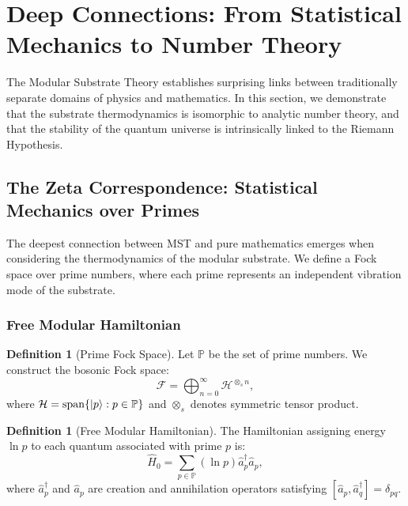 \documentclass[11pt, a4paper]{article}
\theoremstyle{plain}
\theoremstyle{definition}
\newtheorem{definition}[theorem]{Definition}
\begin{document}
\section{Deep Connections: From Statistical Mechanics to Number Theory}
\label{sec:connections}

The Modular Substrate Theory establishes surprising links between traditionally separate domains of physics and mathematics. In this section, we demonstrate that the substrate thermodynamics is isomorphic to analytic number theory, and that the stability of the quantum universe is intrinsically linked to the Riemann Hypothesis.

\subsection{The Zeta Correspondence: Statistical Mechanics over Primes}

The deepest connection between MST and pure mathematics emerges when considering the thermodynamics of the modular substrate. We define a Fock space over prime numbers, where each prime represents an independent vibration mode of the substrate.

\subsubsection{Free Modular Hamiltonian}

\begin{definition}[Prime Fock Space]
Let $\mathbb{P}$ be the set of prime numbers. We construct the bosonic Fock space:
\begin{equation}
\mathcal{F} = \bigoplus_{n=0}^\infty \mathcal{H}^{\otimes_s n},
\end{equation}
where $\mathcal{H} = \text{span}\{\ket{p} : p \in \mathbb{P}\}$ and $\otimes_s$ denotes symmetric tensor product.
\end{definition}

\begin{definition}[Free Modular Hamiltonian]
The Hamiltonian assigning energy $\ln p$ to each quantum associated with prime $p$ is:
\begin{equation}
\hat{H}_0 = \sum_{p \in \mathbb{P}} (\ln p) \hat{a}_p^\dagger \hat{a}_p,
\label{eq:hamiltonian_modular}
\end{equation}
where $\hat{a}_p^\dagger$ and $\hat{a}_p$ are creation and annihilation operators satisfying $[\hat{a}_p, \hat{a}_q^\dagger] = \delta_{pq}$.
\end{definition}
\end{document}
